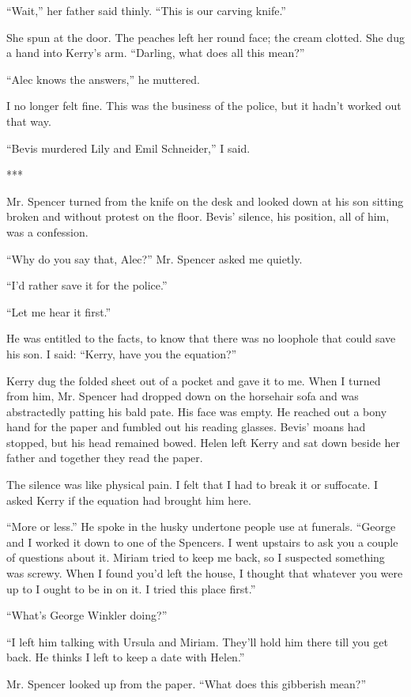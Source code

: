 \documentclass{novel}
\begin{document}
{“Wait,” her father said thinly. “This is our carving knife.”

She spun at the door. The peaches left her round face; the cream clotted. She dug a hand into Kerry’s arm. “Darling, what does all this mean?”

“Alec knows the answers,” he muttered.

I no longer felt fine. This was the business of the police, but it hadn’t worked out that way.

“Bevis murdered Lily and Emil Schneider,” I said.

***

Mr. Spencer turned from the knife on the desk and looked down at his son sitting broken and without protest on the floor. Bevis’ silence, his position, all of him, was a confession.

“Why do you say that, Alec?” Mr. Spencer asked me quietly.

“I’d rather save it for the police.”

“Let me hear it first.”

He was entitled to the facts, to know that there was no loophole that could save his son. I said: “Kerry, have you the equation?”

Kerry dug the folded sheet out of a pocket and gave it to me. When I turned from him, Mr. Spencer had dropped down on the horsehair sofa and was abstractedly patting his bald pate. His face was empty. He reached out a bony hand for the paper and fumbled out his reading glasses. Bevis’ moans had stopped, but his head remained bowed. Helen left Kerry and sat down beside her father and together they read the paper.

The silence was like physical pain. I felt that I had to break it or suffocate. I asked Kerry if the equation had brought him here.

“More or less.” He spoke in the husky undertone people use at funerals. “George and I worked it down to one of the Spencers. I went upstairs to ask you a couple of questions about it. Miriam tried to keep me back, so I suspected something was screwy. When I found you’d left the house, I thought that whatever you were up to I ought to be in on it. I tried this place first.”

“What’s George Winkler doing?”

“I left him talking with Ursula and Miriam. They’ll hold him there till you get back. He thinks I left to keep a date with Helen.”

Mr. Spencer looked up from the paper. “What does this gibberish mean?”

}
\end{document}
